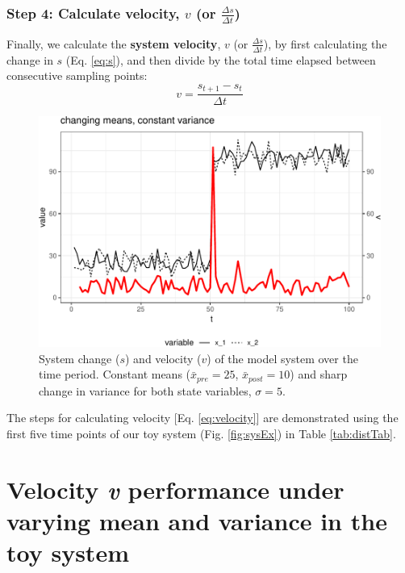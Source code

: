 \documentclass[12pt,twoside,openany]{reedthesis}
\begin{document}
\subsubsection{\texorpdfstring{Step 4: Calculate velocity, \(v\) (or
\(\frac {\Delta s}{\Delta t}\))}{Step 4: Calculate velocity, v (or \textbackslash{}frac \{\textbackslash{}Delta s\}\{\textbackslash{}Delta t\})}}\label{step-4-calculate-velocity-v-or-frac-delta-sdelta-t}

Finally, we calculate the \textbf{system velocity}, \(v\) (or
\(\frac{\Delta s}{\Delta t}\)), by first calculating the change in \(s\)
(Eq. \eqref{eq:s}), and then divide by the total time elapsed between
consecutive sampling points:
\begin{equation}
 v = \frac {s_{t+1}-s_{t}}{\Delta t} 
\label{eq:velocity}
\end{equation}\begin{figure}
{\centering \includegraphics[width=0.95\linewidth]{_myDissertation_files/figure-latex/velocSysEx1-1} 

}

\caption{System change ($s$) and velocity ($v$) of the model system over the time period. Constant means ($\bar{x}_{pre}=25$, $\bar{x}_{post}=10$) and sharp change in variance for both state variables, $\sigma =5$.}\label{fig:velocSysEx1}
\end{figure}
The steps for calculating velocity {[}Eq. \eqref{eq:velocity}{]} are
demonstrated using the first five time points of our toy system (Fig.
\ref{fig:sysEx}) in Table \ref{tab:distTab}.

\section{\texorpdfstring{Velocity \emph{v} performance under varying
mean and variance in the toy
system}{Velocity v performance under varying mean and variance in the toy system}}\label{velocity-v-performance-under-varying-mean-and-variance-in-the-toy-system}
\end{document}
